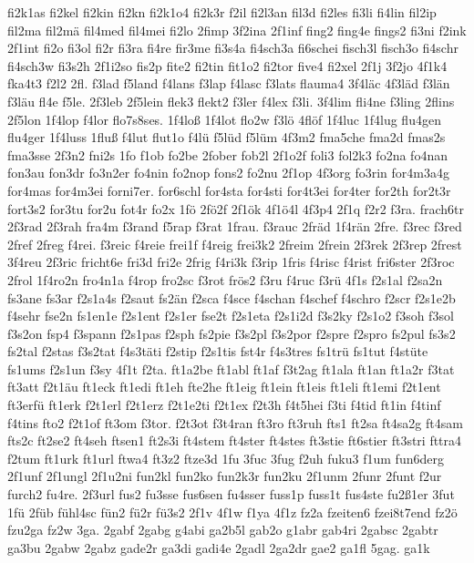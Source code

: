 {fi2k1as
fi2kel
fi2kin
fi2kn
fi2k1o4
fi2k3r
f2il
fi2l3an
fil3d
fi2les
fi3li
fi4lin
fil2ip
fil2ma
fil2mä
fil4med
fil4mei
fi2lo
2fimp
3f2ina
2f1inf
fing2
fing4e
fings2
fi3ni
f2ink
2f1int
fi2o
fi3ol
fi2r
fi3ra
fi4re
fir3me
fi3s4a
fi4sch3a
fi6schei
fisch3l
fisch3o
fi4schr
fi4sch3w
fi3s2h
2f1i2so
fis2p
fite2
fi2tin
fit1o2
fi2tor
five4
fi2xel
2f1j
3f2jo
4f1k4
fka4t3
f2l2
2fl.
f3lad
f5land
f4lans
f3lap
f4lasc
f3lats
flauma4
3f4läc
4f3läd
f3län
f3läu
fl4e
f5le.
2f3leb
2f5lein
flek3
flekt2
f3ler
f4lex
f3li.
3f4lim
fli4ne
f3ling
2flins
2f5lon
1f4lop
f4lor
flo7s8ses.
1f4loß
1f4lot
flo2w
f3lö
4flöf
1f4luc
1f4lug
flu4gen
flu4ger
1f4luss
1fluß
f4lut
flut1o
f4lü
f5lüd
f5lüm
4f3m2
fma5che
fma2d
fmas2s
fma3sse
2f3n2
fni2s
1fo
f1ob
fo2be
2fober
fob2l
2f1o2f
foli3
fol2k3
fo2na
fo4nan
fon3au
fon3dr
fo3n2er
fo4nin
fo2nop
fons2
fo2nu
2f1op
4f3org
fo3rin
for4m3a4g
for4mas
for4m3ei
forni7er.
for6schl
for4sta
for4sti
for4t3ei
for4ter
for2th
for2t3r
fort3s2
for3tu
for2u
fot4r
fo2x
1fö
2fö2f
2f1ök
4f1ö4l
4f3p4
2f1q
f2r2
f3ra.
frach6tr
2f3rad
2f3rah
fra4m
f3rand
f5rap
f3rat
1frau.
f3rauc
2fräd
1f4rän
2fre.
f3rec
f3red
2fref
2freg
f4rei.
f3reic
f4reie
frei1f
f4reig
frei3k2
2freim
2frein
2f3rek
2f3rep
2frest
3f4reu
2f3ric
fricht6e
fri3d
fri2e
2frig
f4ri3k
f3rip
1fris
f4risc
f4rist
fri6ster
2f3roc
2frol
1f4ro2n
fro4n1a
f4rop
fro2sc
f3rot
frös2
f3ru
f4ruc
f3rü
4f1s
f2s1al
f2sa2n
fs3ane
fs3ar
f2s1a4s
f2saut
fs2än
f2sca
f4sce
f4schan
f4schef
f4schro
f2scr
f2s1e2b
f4sehr
fse2n
fs1en1e
f2s1ent
f2s1er
fse2t
f2s1eta
f2s1i2d
f3s2ky
f2s1o2
f3soh
f3sol
f3s2on
fsp4
f3spann
f2s1pas
f2sph
fs2pie
f3s2pl
f3s2por
f2spre
f2spro
fs2pul
fs3s2
fs2tal
f2stas
f3s2tat
f4s3täti
f2stip
f2s1tis
fst4r
f4s3tres
fs1trü
fs1tut
f4stüte
fs1ums
f2s1un
f3sy
4f1t
f2ta.
ft1a2be
ft1abl
ft1af
f3t2ag
ft1ala
ft1an
ft1a2r
f3tat
ft3att
f2t1äu
ft1eck
ft1edi
ft1eh
fte2he
ft1eig
ft1ein
ft1eis
ft1eli
ft1emi
f2t1ent
ft3erfü
ft1erk
f2t1erl
f2t1erz
f2t1e2ti
f2t1ex
f2t3h
f4t5hei
f3ti
f4tid
ft1in
f4tinf
f4tins
fto2
f2t1of
ft3om
f3tor.
f2t3ot
f3t4ran
ft3ro
ft3ruh
fts1
ft2sa
ft4sa2g
ft4sam
fts2c
ft2se2
ft4seh
ftsen1
ft2s3i
ft4stem
ft4ster
ft4stes
ft3stie
ft6stier
ft3stri
fttra4
f2tum
ft1urk
ft1url
ftwa4
ft3z2
ftze3d
1fu
3fuc
3fug
f2uh
fuku3
f1um
fun6derg
2f1unf
2f1ungl
2f1u2ni
fun2kl
fun2ko
fun2k3r
fun2ku
2f1unm
2funr
2funt
f2ur
furch2
fu4re.
2f3url
fus2
fu3sse
fus6sen
fu4sser
fuss1p
fuss1t
fus4ste
fu2ß1er
3fut
1fü
2füb
fühl4sc
fün2
fü2r
fü3s2
2f1v
4f1w
f1ya
4f1z
fz2a
fzeiten6
fzei8t7end
fz2ö
fzu2ga
fz2w
3ga.
2gabf
2gabg
g4abi
ga2b5l
gab2o
g1abr
gab4ri
2gabsc
2gabtr
ga3bu
2gabw
2gabz
gade2r
ga3di
gadi4e
2gadl
2ga2dr
gae2
ga1fl
5gag.
ga1k
}
